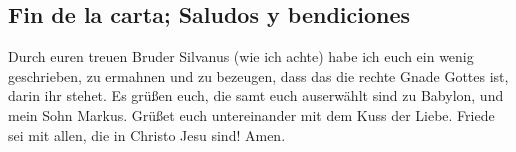 \hypertarget{fin-de-la-carta-saludos-y-bendiciones}{%
\subsection{Fin de la carta; Saludos y
bendiciones}\label{fin-de-la-carta-saludos-y-bendiciones}}

 Durch euren treuen Bruder Silvanus (wie ich achte) habe
ich euch ein wenig geschrieben, zu ermahnen und zu bezeugen, dass das
die rechte Gnade Gottes ist, darin ihr stehet.  Es grüßen
euch, die samt euch auserwählt sind zu Babylon, und mein Sohn Markus.
 Grüßet euch untereinander mit dem Kuss der Liebe. Friede
sei mit allen, die in Christo Jesu sind! Amen.
